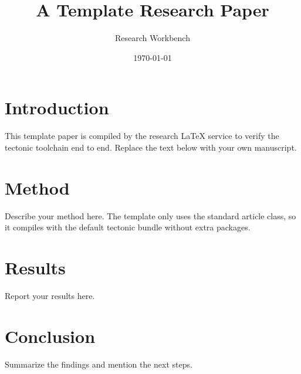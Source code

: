 \documentclass{article}
\title{A Template Research Paper}
\author{Research Workbench}
\date{\today}
\begin{document}
\maketitle

\section{Introduction}
This template paper is compiled by the research LaTeX service to verify the
tectonic toolchain end to end. Replace the text below with your own
manuscript.

\section{Method}
Describe your method here. The template only uses the standard article
class, so it compiles with the default tectonic bundle without extra
packages.

\section{Results}
Report your results here.

\section{Conclusion}
Summarize the findings and mention the next steps.
\end{document}
